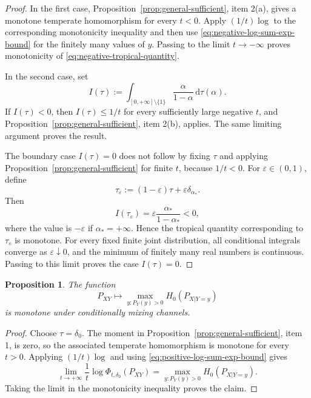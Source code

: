 \documentclass[aps,pra,11pt,onecolumn,nofootinbib,tightenlines]{revtex4-2}
\newtheorem{proposition}[theorem]{Proposition}
\theoremstyle{definition}
\begin{document}
\begin{proof}
In the first case, Proposition~\ref{prop:general-sufficient}, item 2(a), gives a monotone temperate homomorphism for every $t<0$. Apply $(1/t)\log$ to the corresponding monotonicity inequality and then use \eqref{eq:negative-log-sum-exp-bound} for the finitely many values of $y$. Passing to the limit $t\to-\infty$ proves monotonicity of \eqref{eq:negative-tropical-quantity}.

In the second case, set
\begin{equation}
 I(\tau):=
 \int_{[0,+\infty]\setminus\{1\}}
 \frac{\alpha}{1-\alpha}\,\mathrm d\tau(\alpha).
 \label{eq:def-I-tau}
\end{equation}
If $I(\tau)<0$, then $I(\tau)\leq1/t$ for every sufficiently large negative $t$, and Proposition~\ref{prop:general-sufficient}, item 2(b), applies. The same limiting argument proves the result.

The boundary case $I(\tau)=0$ does not follow by fixing $\tau$ and applying Proposition~\ref{prop:general-sufficient} for finite $t$, because $1/t<0$. For $\varepsilon\in(0,1)$, define
\begin{equation}
 \tau_\varepsilon
 :=(1-\varepsilon)\tau+
   \varepsilon\delta_{\alpha_*}.
 \label{eq:tropical-boundary-approximation}
\end{equation}
Then
\begin{equation}
 I(\tau_\varepsilon)
 =\varepsilon\frac{\alpha_*}{1-\alpha_*}<0,
 \label{eq:tropical-boundary-negative-moment}
\end{equation}
where the value is $-\varepsilon$ if $\alpha_*=+\infty$. Hence the tropical quantity corresponding to $\tau_\varepsilon$ is monotone. For every fixed finite joint distribution, all conditional integrals converge as $\varepsilon\downarrow0$, and the minimum of finitely many real numbers is continuous. Passing to this limit proves the case $I(\tau)=0$.
\end{proof}

\begin{proposition}
\label{prop:positive-tropical-sufficient}
The function
\begin{equation}
 P_{XY}\longmapsto
 \max_{y:P_Y(y)>0}H_0(P_{X|Y=y})
 \label{eq:positive-tropical-quantity}
\end{equation}
 is monotone under conditionally mixing channels.
\end{proposition}

\begin{proof}
Choose $\tau=\delta_0$. The moment in Proposition~\ref{prop:general-sufficient}, item 1, is zero, so the associated temperate homomorphism is monotone for every $t>0$. Applying $(1/t)\log$ and using \eqref{eq:positive-log-sum-exp-bound} gives
\begin{equation}
 \lim_{t\to+\infty}
 \frac1t\log\Phi_{t,\delta_0}(P_{XY})
 =\max_{y:P_Y(y)>0}H_0(P_{X|Y=y}).
 \label{eq:positive-tropical-limit}
\end{equation}
Taking the limit in the monotonicity inequality proves the claim.
\end{proof}
\end{document}
